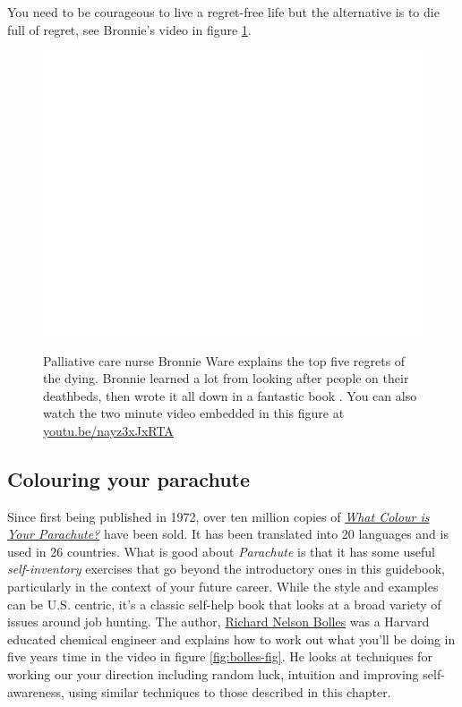 \documentclass[
]{book}
\begin{document}
You need to be courageous to live a regret-free life but the alternative is to die full of regret, see Bronnie's video in figure \ref{fig:bronnie-fig}.

\begin{figure}

{\centering \href{https://www.youtube.com/embed/nayz3xJxRTA}{\includegraphics[width=0.99\linewidth]{cdyf_files/figure-latex/bronnie-fig-1} }

}

\caption{Palliative care nurse Bronnie Ware explains the top five regrets of the dying. Bronnie learned a lot from looking after people on their deathbeds, then wrote it all down in a fantastic book \citep{regrets}. You can also watch the two minute video embedded in this figure at \href{https://youtu.be/nayz3xJxRTA}{youtu.be/nayz3xJxRTA} \citep{youtube-bronnie}}\label{fig:bronnie-fig}
\end{figure}



\hypertarget{parachute}{%
\subsection{Colouring your parachute}\label{parachute}}

Since first being published in 1972, over ten million copies of \emph{\href{https://en.wikipedia.org/wiki/What_Color_is_Your_Parachute\%3F}{What Colour is Your Parachute?}} have been sold. It has been translated into 20 languages and is used in 26 countries. What is good about \emph{Parachute} is that it has some useful \emph{self-inventory} exercises that go beyond the introductory ones in this guidebook, particularly in the context of your future career. While the style and examples can be U.S. centric, it's a classic self-help book that looks at a broad variety of issues around job hunting. The author, \href{https://en.wikipedia.org/wiki/Richard_Nelson_Bolles}{Richard Nelson Bolles} was a Harvard educated chemical engineer and explains how to work out what you'll be doing in five years time in the video in figure \ref{fig:bolles-fig}. He looks at techniques for working our your direction including random luck, intuition and improving self-awareness, using similar techniques to those described in this chapter.
\end{document}
